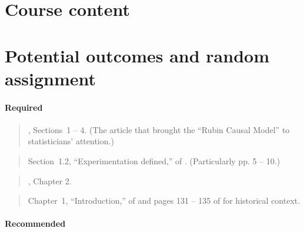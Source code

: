 \documentclass[12pt]{article}
\begin{document}
\section*{Course content}

\section{Potential outcomes and random assignment}


\paragraph*{Required}

\begin{verse}, Sections~1 -- 4. (The article that brought the ``Rubin Causal Model'' to  statisticians' attention.)\end{verse}

\begin{verse} Section~1.2, ``Experimentation defined,''  of
.  (Particularly pp. 5 -- 10.) \end{verse}

\begin{verse} , Chapter 2. \end{verse}

\begin{verse} Chapter~1, ``Introduction,'' of  and pages 131 -- 135 of  for historical context. \end{verse}

\paragraph*{Recommended}

\begin{verse}  \end{verse}
\end{document}
